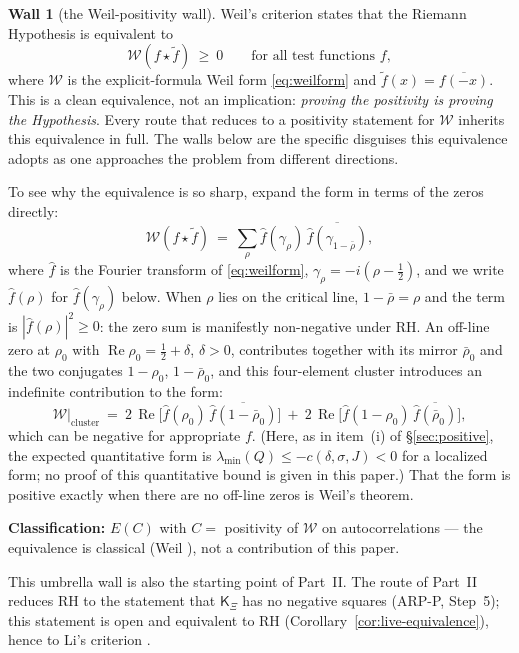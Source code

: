 \documentclass[11pt]{amsart}
\theoremstyle{definition}
\theoremstyle{remark}
\theoremstyle{definition}
\newtheorem{obstruction}{Wall}[section]
\renewcommand{\Re}{\operatorname{Re}}
\newcommand{\cW}{\mathcal{W}}
\newcommand{\KXi}{\mathsf{K}_\Xi}
\begin{document}
\begin{obstruction}[the Weil-positivity wall]\label{ob:weil}
Weil's criterion \cite{Weil1952} states that the Riemann Hypothesis is equivalent to
\[
   \cW(f\star\tilde f)\ \ge\ 0\qquad\text{for all test functions }f,
\]
where $\cW$ is the explicit-formula Weil form \eqref{eq:weilform} and $\tilde f(x)=\overline{f(-x)}$. This
is a clean equivalence, not an implication: \emph{proving the positivity is proving the Hypothesis}. Every
route that reduces to a positivity statement for $\cW$ inherits this equivalence in full. The walls below
are the specific disguises this equivalence adopts as one approaches the problem from different directions.

To see why the equivalence is so sharp, expand the form in terms of the zeros directly:
\[
   \cW(f\star\tilde f)\ =\ \sum_\rho \widehat f(\gamma_\rho)\,\overline{\widehat f(\gamma_{1-\bar\rho})},
\]
where $\widehat f$ is the Fourier transform of \eqref{eq:weilform}, $\gamma_\rho=-i(\rho-\tfrac12)$, and
we write $\widehat f(\rho)$ for $\widehat f(\gamma_\rho)$ below. When $\rho$ lies on the critical line, $1-\bar\rho=\rho$ and
the term is $|\widehat f(\rho)|^2\ge0$: the zero sum is manifestly non-negative under RH. An off-line zero
at $\rho_0$ with $\Re\rho_0=\tfrac12+\delta$, $\delta>0$, contributes together with its mirror $\bar\rho_0$
and the two conjugates $1-\rho_0$, $1-\bar\rho_0$, and this four-element cluster introduces an indefinite
contribution to the form:
\[
   \cW\big|_{\text{cluster}}\ =\ 2\,\Re\bigl[\widehat f(\rho_0)\,\overline{\widehat f(1-\bar\rho_0)}\bigr]
   \ +\ 2\,\Re\bigl[\widehat f(1-\rho_0)\,\overline{\widehat f(\bar\rho_0)}\bigr],
\]
which can be negative for appropriate $f$. (Here, as in item~(i) of \S\ref{sec:positive}, the expected
quantitative form is $\lambda_{\min}(Q)\le -c(\delta,\sigma,J)<0$ for a localized form; no proof of this
quantitative bound is given in this paper.) That the form is positive exactly when there are no off-line
zeros is Weil's theorem.

\smallskip\noindent\textbf{Classification:} $E(C)$ with $C=$ positivity of $\cW$ on autocorrelations ---
the equivalence is classical (Weil \cite{Weil1952}), not a contribution of this paper.
\end{obstruction}

\noindent This umbrella wall is also the starting point of Part~II. The route of Part~II reduces RH to the
statement that $\KXi$ has no negative squares (ARP-P, Step~5); this statement is open and equivalent
to RH (Corollary~\ref{cor:live-equivalence}), hence to Li's criterion \cite{Li}.
\end{document}
